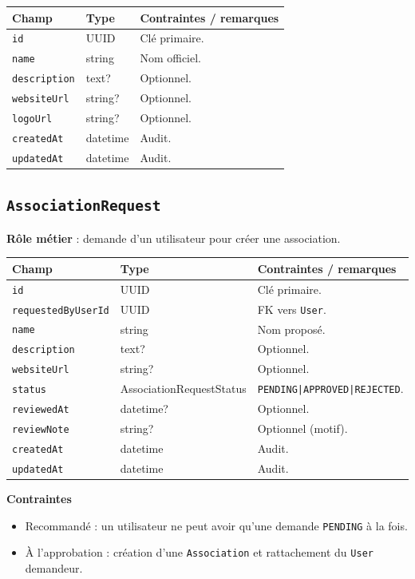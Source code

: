 \documentclass[11pt,a4paper]{article}
\begin{document}
\begin{longtable}{@{}p{}p{}p{}@{}}
\toprule
\textbf{Champ} & \textbf{Type} & \textbf{Contraintes / remarques}\\
\midrule
\endhead
\texttt{id} & UUID & Clé primaire.\\
\texttt{name} & string & Nom officiel.\\
\texttt{description} & text? & Optionnel.\\
\texttt{websiteUrl} & string? & Optionnel.\\
\texttt{logoUrl} & string? & Optionnel.\\
\texttt{createdAt} & datetime & Audit.\\
\texttt{updatedAt} & datetime & Audit.\\
\bottomrule
\end{longtable}

\subsection{\texttt{AssociationRequest}}
\textbf{Rôle métier} : demande d’un utilisateur pour créer une association.

\begin{longtable}{@{}p{}p{}p{}@{}}
\toprule
\textbf{Champ} & \textbf{Type} & \textbf{Contraintes / remarques}\\
\midrule
\endhead
\texttt{id} & UUID & Clé primaire.\\
\texttt{requestedByUserId} & UUID & FK vers \texttt{User}.\\
\texttt{name} & string & Nom proposé.\\
\texttt{description} & text? & Optionnel.\\
\texttt{websiteUrl} & string? & Optionnel.\\
\texttt{status} & AssociationRequestStatus & \texttt{PENDING|APPROVED|REJECTED}.\\
\texttt{reviewedAt} & datetime? & Optionnel.\\
\texttt{reviewNote} & string? & Optionnel (motif).\\
\texttt{createdAt} & datetime & Audit.\\
\texttt{updatedAt} & datetime & Audit.\\
\bottomrule
\end{longtable}

\textbf{Contraintes}
\begin{itemize}
  \item Recommandé : un utilisateur ne peut avoir qu’une demande \texttt{PENDING} à la fois.
  \item À l’approbation : création d’une \texttt{Association} et rattachement du \texttt{User} demandeur.
\end{itemize}
\end{document}
